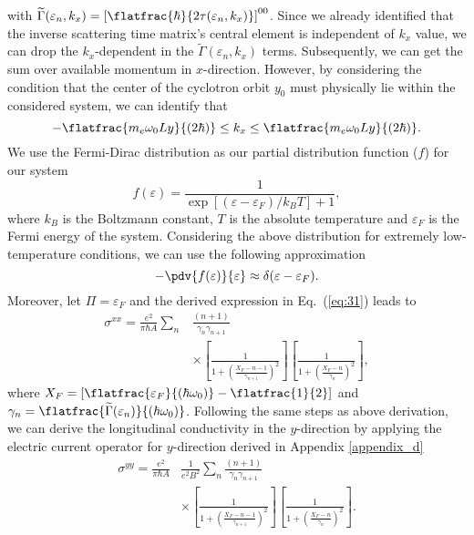 with $\widetilde{{\Gamma}}(\varepsilon_n,k_x) = \left[\flatfrac{\hbar}{2\tau(\varepsilon_n,k_x)}\right]^{00}$. Since we already identified that the inverse scattering time matrix's central element is independent of $k_x$ value, we can drop the $k_x$-dependent in the $\widetilde{{\Gamma}}(\varepsilon_n,k_x)$ terms. Subsequently, we can get the sum over available momentum in $x$-direction.
However, by considering the condition that the center of the cyclotron orbit $y_0$ must physically lie within the considered system, we can identify that
\begin{equation} \label{eq:32}
 -\flatfrac{m_e\omega_0 Ly}{(2\hbar)} \leq k_x \leq \flatfrac{m_e\omega_0 Ly}{(2\hbar)}.
\end{equation}
We use the Fermi-Dirac distribution as our partial distribution function ($f$) for our system
\begin{equation} \label{eq:33}
  f(\varepsilon) = \frac{1}{\exp[(\varepsilon - \varepsilon_F)/k_B T]+1},
\end{equation}
where $k_B$ is the Boltzmann constant, $T$ is the absolute temperature and $\varepsilon_F$ is the Fermi energy of the system. Considering the above distribution for extremely low-temperature conditions, we can use the following approximation
\begin{equation} \label{eq:34}
  - \pdv{f(\varepsilon)}{\varepsilon} \approx \delta(\varepsilon - \varepsilon_F).
\end{equation}
Moreover, let $\Pi = \varepsilon_F$ and the derived expression in Eq.~(\ref{eq:31}) leads to
\begin{equation} \label{eq:35}
  \begin{aligned}
    \sigma^{xx}  =
    \frac{e^2}{\pi\hbar A}
    \sum_{n} &
    \frac{(n+1)}{\gamma_{n}\gamma_{n+1}} \\
    &\times
    \left[
      \frac{1}
      {
        1 + \left(\frac{X_F - n -1}{\gamma_{n+1}}\right)^2
      }
    \right]
    \left[
      \frac{1}
      {
        1 + \left(\frac{X_F - n}{\gamma_{n}}\right)^2
      }
    \right],
  \end{aligned}
\end{equation}
where $X_F = \left[\flatfrac{\varepsilon_F}{(\hbar \omega_0)} - \flatfrac{1}{2}\right]$
and
$\gamma_n = \flatfrac{\widetilde{{\Gamma}}(\varepsilon_n)}{(\hbar \omega_0)}$.
Following the same steps as above derivation, we can derive the longitudinal conductivity in the $y$-direction by applying the electric current operator for $y$-direction derived in Appendix \ref{appendix_d}
\begin{equation} \label{eq:36}
  \begin{aligned}
    {\sigma}^{yy} =
    \frac{e^2}{\pi\hbar A} &
    \frac{1}{e^2B^2}
    \sum_{n}
    \frac{(n+1)}{\gamma_{n}\gamma_{n+1}} \\
    & \times
    \left[
      \frac{1}
      {
        1 + \left(\frac{X_F - n -1}{\gamma_{n+1}}\right)^2
      }
    \right]
    \left[
      \frac{1}
      {
        1 + \left(\frac{X_F - n}{\gamma_{n}}\right)^2
      }
    \right].
  \end{aligned}
\end{equation}
